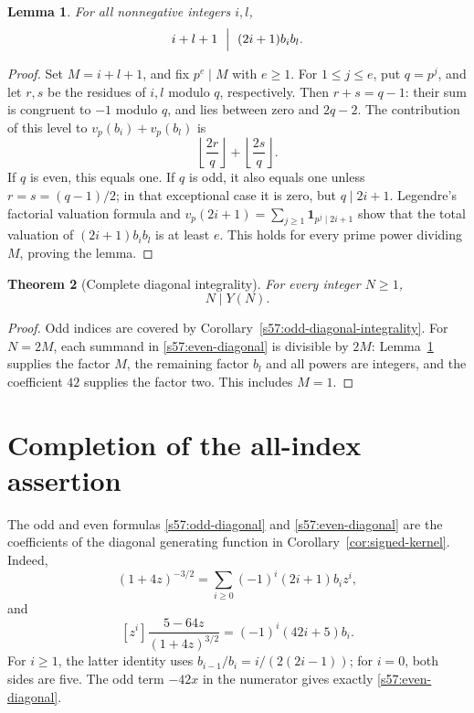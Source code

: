 \documentclass[11pt,a4paper]{article}
\numberwithin{equation}{section}
\newtheorem{theorem}{Theorem}[section]
\newtheorem{lemma}[theorem]{Lemma}
\theoremstyle{remark}
\begin{document}
\begin{lemma}
\label{s57:termwise-even}
For all nonnegative integers \(i,l\),
\[
             i+l+1\ \Bigm|\ (2i+1)b_i b_l.
\]
\end{lemma}
\begin{proof}
Set \(M=i+l+1\), and fix \(p^e\mid M\) with \(e\ge1\).
For \(1\le j\le e\), put \(q=p^j\), and let \(r,s\) be the
residues of \(i,l\) modulo \(q\), respectively. Then
\(r+s=q-1\): their sum is congruent to \(-1\) modulo \(q\),
and lies between zero and \(2q-2\).
The contribution of this level to \(v_p(b_i)+v_p(b_l)\) is
\[
                  \left\lfloor\frac{2r}{q}\right\rfloor
                  +\left\lfloor\frac{2s}{q}\right\rfloor.
\]
If \(q\) is even, this equals one. If \(q\) is odd, it also equals
one unless \(r=s=(q-1)/2\); in that exceptional case it is zero,
but \(q\mid2i+1\). Legendre's factorial valuation formula and
\(v_p(2i+1)=\sum_{j\ge1}\mathbf 1_{p^j\mid2i+1}\) show that
the total valuation of \((2i+1)b_i b_l\) is at least \(e\).
This holds for every prime power dividing \(M\), proving the lemma.
\end{proof}

\begin{theorem}[Complete diagonal integrality]
\label{s57:complete-diagonal}
For every integer \(N\ge1\),
\[
                              N\mid Y(N).
\]
\end{theorem}
\begin{proof}
Odd indices are covered by
Corollary~\ref{s57:odd-diagonal-integrality}. For \(N=2M\),
each summand in \eqref{s57:even-diagonal} is divisible by \(2M\):
Lemma~\ref{s57:termwise-even} supplies the factor \(M\), the
remaining factor \(b_l\) and all powers are integers, and the
coefficient \(42\) supplies the factor two. This includes \(M=1\).
\end{proof}


\section{Completion of the all-index assertion}
\label{sec:finish-allN}

The odd and even formulas \eqref{s57:odd-diagonal} and
\eqref{s57:even-diagonal} are the coefficients of the diagonal
generating function in Corollary~\ref{cor:signed-kernel}.
Indeed,
\[
 (1+4z)^{-3/2}=\sum_{i\ge0}(-1)^i(2i+1)b_i z^i,
\]
and
\[
 [z^i]\frac{5-64z}{(1+4z)^{3/2}}
                =(-1)^i(42i+5)b_i.
\]
For \(i\ge1\), the latter identity uses
\(b_{i-1}/b_i=i/(2(2i-1))\); for \(i=0\), both sides are five.
The odd term \(-42x\) in the numerator gives exactly
\eqref{s57:even-diagonal}.
\end{document}
